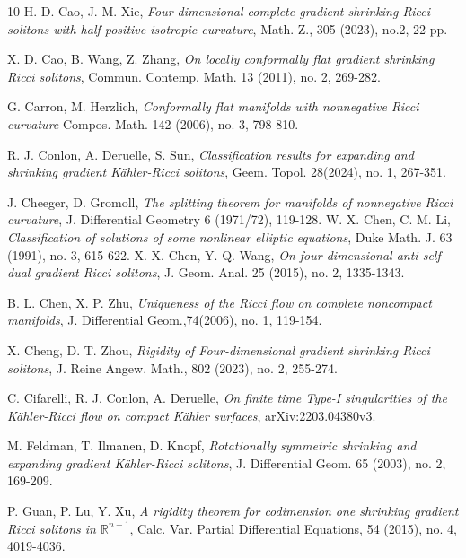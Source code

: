 \documentclass[12pt]{amsart}
\begin{document}
\begin{thebibliography}{10}
		H. D. Cao, J. M. Xie, {\em Four-dimensional complete gradient shrinking Ricci solitons with half positive isotropic curvature}, Math. Z., 305 (2023), no.2, 22 pp.
		
		X. D. Cao, B. Wang, Z. Zhang, {\em On locally conformally flat gradient shrinking Ricci solitons}, Commun. Contemp. Math. 13 (2011), no. 2, 269-282.

		G. Carron, M. Herzlich, {\em Conformally flat manifolds with nonnegative Ricci curvature}
		Compos. Math. 142 (2006), no. 3, 798-810.



        R. J. Conlon, A. Deruelle, S. Sun, {\em Classification results for expanding and shrinking gradient K\"ahler-Ricci solitons},  Geem. Topol. 28(2024), no. 1, 267-351.




		
		
		J. Cheeger, D. Gromoll, {\em The splitting theorem for manifolds of nonnegative Ricci curvature}, J. Differential Geometry 6 (1971/72), 119-128.
		W. X. Chen, C. M. Li,   {\em Classification of solutions of some nonlinear elliptic equations}, Duke Math. J. 63 (1991), no. 3, 615-622.
		X. X. Chen, Y. Q. Wang, {\em On four-dimensional anti-self-dual gradient Ricci solitons}, J. Geom. Anal. 25 (2015), no. 2, 1335-1343.
		
		 B. L. Chen, X. P. Zhu, {\em Uniqueness of the Ricci flow on complete noncompact manifolds}, J. Differential Geom.,74(2006), no. 1, 119-154.
		
		
		
		X. Cheng, D. T. Zhou, {\em Rigidity of Four-dimensional gradient shrinking Ricci solitons}, J. Reine Angew. Math., 802 (2023), no. 2, 255-274.
		
		 C. Cifarelli, R. J. Conlon, A. Deruelle, {\em On finite time Type-I singularities of the K\"ahler-Ricci flow on compact K\"ahler surfaces}, arXiv:2203.04380v3.
		
		M. Feldman, T. Ilmanen, D. Knopf, {\em Rotationally symmetric shrinking and expanding gradient K\"ahler-Ricci solitons}, J. Differential Geom. 65 (2003), no. 2, 169-209.
		
		P. Guan, P. Lu, Y. Xu, {\em A rigidity theorem for codimension one shrinking gradient Ricci solitons in $\mathbb R^{n+1}$}, Calc. Var. Partial Differential Equations, 54 (2015), no. 4, 4019-4036.
		

\end{thebibliography}
\end{document}
